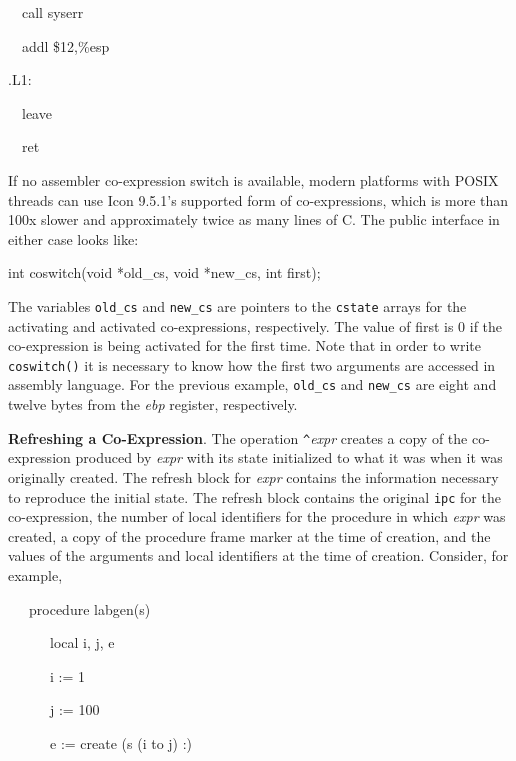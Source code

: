 {\ttfamily\mdseries
\ \ call syserr}

{\ttfamily\mdseries
\ \ addl \$12,\%esp}


\bigskip

{\ttfamily\mdseries
.L1:}

{\ttfamily\mdseries
\ \ leave}

{\ttfamily\mdseries
\ \ ret}


If no assembler co-expression switch is available, modern platforms
with POSIX threads can use Icon 9.5.1's supported form of
co-expressions, which is more than 100x slower and approximately twice
as many lines of C. The public interface in either case looks like:

{\ttfamily\mdseries
int coswitch(void *old\_cs, void *new\_cs, int first);}

The variables \texttt{old\_cs} and \texttt{new\_cs} are pointers to
the \texttt{cstate} arrays for the activating and activated
co-expressions, respectively. The value of first is 0 if the
co-expression is being activated for the first time. Note that in
order to write \texttt{coswitch()} it is necessary to know how the
first two arguments are accessed in assembly language. For the
previous example, \texttt{old\_cs} and \texttt{new\_cs} are eight and
twelve bytes from the \textit{ebp }register, respectively.

\textbf{Refreshing a Co-Expression}. The operation
\texttt{\textit{\^{}}}\textit{expr} creates a copy of
the co-expression produced by \textit{expr} with its
state initialized to what it was when it was originally created. The
refresh block for \textit{expr} contains the
information necessary to reproduce the initial state. The refresh
block contains the original \texttt{ipc} for the co-expression, the
number of local identifiers for the procedure in which
\textit{expr} was created, a copy of the procedure
frame marker at the time of creation, and the values of the arguments
and local identifiers at the time of creation. Consider, for example,

{\ttfamily\mdseries
\ \ \ procedure labgen(s)}

{\ttfamily\mdseries
\ \ \ \ \ \ local i, j, e}

{\ttfamily\mdseries
\ \ \ \ \ \ i := 1}

{\ttfamily\mdseries
\ \ \ \ \ \ j := 100}

{\ttfamily\mdseries
\ \ \ \ \ \ e := create (s {\textbar}{\textbar} (i to j) {\textbar}{\textbar} {\textquotedbl}:{\textquotedbl})}

